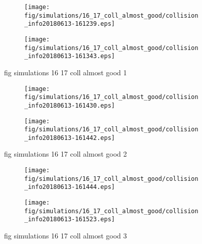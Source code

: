 \begin{figure}[H]
	\centering
	\begin{subfigure}[b]{0.8\textwidth}
		\texttt{[image: fig/simulations/16\_17\_coll\_almost\_good/collision\_info20180613-161239.eps]}
		\caption{}
		\label{fig:simulations:16_17_coll_almost_good:collision_info20180613-161239}
	\end{subfigure}

	\begin{subfigure}[b]{0.8\textwidth}
		\texttt{[image: fig/simulations/16\_17\_coll\_almost\_good/collision\_info20180613-161343.eps]}
		\caption{}
		\label{fig:simulations:16_17_coll_almost_good:collision_info20180613-161343}
	\end{subfigure}
	\caption{fig simulations 16 17 coll almost good 1}
	\label{fig:simulations:16_17_coll_almost_good:1}
\end{figure}

\begin{figure}[H]
	\centering
	\begin{subfigure}[b]{0.8\textwidth}
		\texttt{[image: fig/simulations/16\_17\_coll\_almost\_good/collision\_info20180613-161430.eps]}
		\caption{}
		\label{fig:simulations:16_17_coll_almost_good:collision_info20180613-161430}
	\end{subfigure}

	\begin{subfigure}[b]{0.8\textwidth}
		\texttt{[image: fig/simulations/16\_17\_coll\_almost\_good/collision\_info20180613-161442.eps]}
		\caption{}
		\label{fig:simulations:16_17_coll_almost_good:collision_info20180613-161442}
	\end{subfigure}
	\caption{fig simulations 16 17 coll almost good 2}
	\label{fig:simulations:16_17_coll_almost_good:2}
\end{figure}

\begin{figure}[H]
	\centering
	\begin{subfigure}[b]{0.8\textwidth}
		\texttt{[image: fig/simulations/16\_17\_coll\_almost\_good/collision\_info20180613-161444.eps]}
		\caption{}
		\label{fig:simulations:16_17_coll_almost_good:collision_info20180613-161444}
	\end{subfigure}

	\begin{subfigure}[b]{0.8\textwidth}
		\texttt{[image: fig/simulations/16\_17\_coll\_almost\_good/collision\_info20180613-161523.eps]}
		\caption{}
		\label{fig:simulations:16_17_coll_almost_good:collision_info20180613-161523}
	\end{subfigure}
	\caption{fig simulations 16 17 coll almost good 3}
	\label{fig:simulations:16_17_coll_almost_good:3}
\end{figure}

